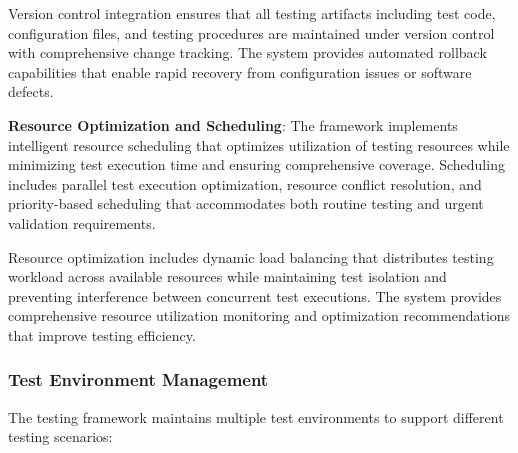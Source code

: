 \documentclass[12pt,a4paper]{report}
\begin{document}
Version control integration ensures that all testing artifacts including test code, configuration files, and testing
procedures are maintained under version control with comprehensive change tracking. The system provides automated
rollback capabilities that enable rapid recovery from configuration issues or software defects.

\textbf{Resource Optimization and Scheduling}: The framework implements intelligent resource scheduling that optimizes
utilization of testing resources while minimizing test execution time and ensuring comprehensive coverage. Scheduling
includes parallel test execution optimization, resource conflict resolution, and priority-based scheduling that
accommodates both routine testing and urgent validation requirements.

Resource optimization includes dynamic load balancing that distributes testing workload across available resources while
maintaining test isolation and preventing interference between concurrent test executions. The system provides
comprehensive resource utilization monitoring and optimization recommendations that improve testing efficiency.

\subsubsection{Test Environment Management}

The testing framework maintains multiple test environments to support different testing scenarios:
\end{document}
